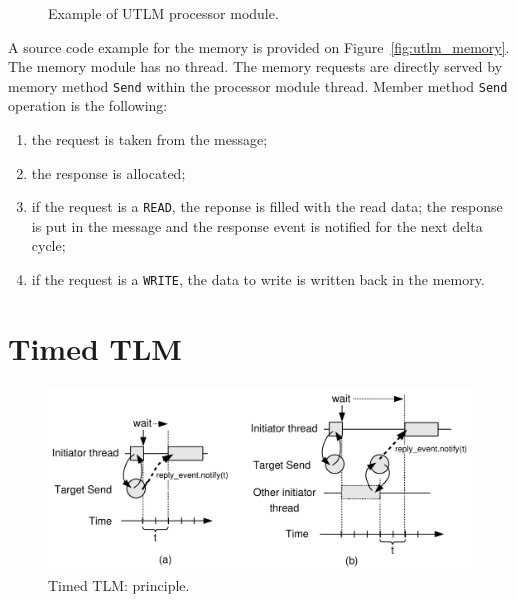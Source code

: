 \begin{figure}[p]
  \begin{center}
    
    \caption{\label{fig:utlm_processor} Example of UTLM processor
      module.}
  \end{center}
\end{figure}

A source code example for the memory is provided on
Figure~\ref{fig:utlm_memory}. The memory module has no thread. The
memory requests are directly served by memory method \texttt{Send}
within the processor module thread. Member method \texttt{Send}
operation is the following:

\begin{enumerate}
\item[{\large \ding{202}}] the request is taken from the message;
\item[{\large \ding{203}}] the response is allocated;
\item[{\large \ding{204}}] if the request is a \texttt{READ}, the
  reponse is filled with the read data; the response is put in the
  message and the response event is notified for the next delta cycle;
\item[{\large \ding{205}}] if the request is a \texttt{WRITE}, the
  data to write is written back in the memory.
\end{enumerate}


\section{Timed TLM}
\label{sec:timed_tlm}

\begin{figure}[h]
  \begin{center}
    \includegraphics[width=\textwidth]{tlm/ttlm_principle.pdf}
    \caption{\label{fig:ttlm_principle} Timed TLM: principle.}
  \end{center}
\end{figure}

